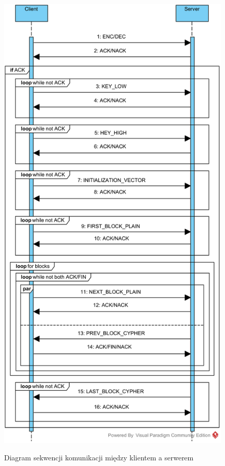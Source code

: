 \begin{figure}
\centering
\includegraphics{communication-sequence.png}
\label{fig:communication-sequence}
\caption{Diagram sekwencji komunikacji między klientem a serwerem}
\end{figure}

